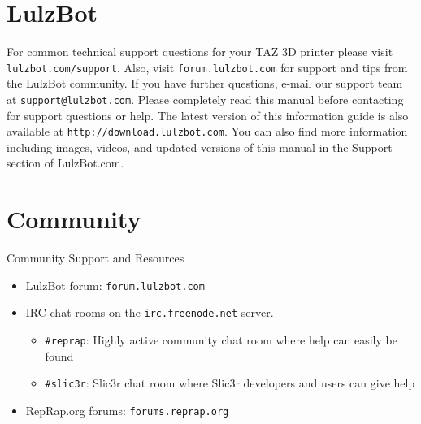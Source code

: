 \section{LulzBot}
\setlength{\parindent}{0pt}
For common technical support questions for your TAZ 3D printer please visit \texttt{lulzbot.com/support}. Also, visit \texttt{forum.lulzbot.com} for support and tips from the LulzBot community. If you have further questions, e-mail our support team at \texttt{support@lulzbot.com}. Please completely read this manual before contacting for support questions or help. The latest version of this information guide is also available at \texttt{http://download.lulzbot.com}. You can also find more information including images, videos, and updated versions of this manual in the Support section of LulzBot.com.

\section{Community}
Community Support and Resources

\begin{itemize}

\item LulzBot forum: \texttt{forum.lulzbot.com}
\item IRC chat rooms on the \texttt{irc.freenode.net} server.
	\begin{itemize}
	\item \texttt{\#reprap}: Highly active community chat room where help can easily be found
	\item \texttt{\#slic3r}: Slic3r chat room where Slic3r developers and users can give help
	\end{itemize}
\item RepRap.org forums: \texttt{forums.reprap.org}

\end{itemize}
